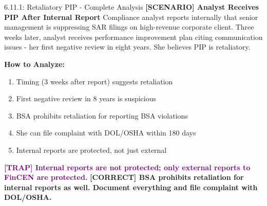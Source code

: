 \documentclass[11pt,a4paper]{beamer}
\newcommand{\trap}[1]{\textcolor{purple}{\textbf{[TRAP] #1}}}
\newcommand{\correct}[1]{\textcolor{green!50!black}{\textbf{[CORRECT] #1}}}
\newcommand{\scenario}[1]{\textcolor{blue!70!black}{\textbf{[SCENARIO] #1}}}
\begin{document}
\begin{frame}{6.11.1: Retaliatory PIP - Complete Analysis}
	\scenario{Analyst Receives PIP After Internal Report}
	Compliance analyst reports internally that senior management is suppressing SAR filings on high-revenue corporate client. Three weeks later, analyst receives performance improvement plan citing communication issues - her first negative review in eight years. She believes PIP is retaliatory.
	
	\vspace{0.1cm}
	\textbf{How to Analyze:}
	\begin{enumerate}
		\item Timing (3 weeks after report) suggests retaliation
		\item First negative review in 8 years is suspicious
		\item BSA prohibits retaliation for reporting BSA violations
		\item She can file complaint with DOL/OSHA within 180 days
		\item Internal reports are protected, not just external
	\end{enumerate}
	\trap{Internal reports are not protected; only external reports to FinCEN are protected.}
	\correct{BSA prohibits retaliation for internal reports as well. Document everything and file complaint with DOL/OSHA.}
\end{frame}
\end{document}
